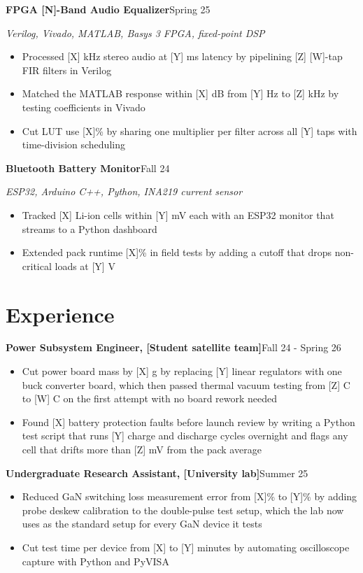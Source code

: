 \documentclass[letterpaper,11pt]{article}
\newlength{\itemgap}           %
\newcommand{\entry}[2]{\textbf{#1}\hfill #2\par}
\newcommand{\skillsused}[1]{\textit{#1}\par}
\begin{document}
\entry{FPGA [N]-Band Audio Equalizer}{Spring 25}
\skillsused{Verilog, Vivado, MATLAB, Basys 3 FPGA, fixed-point DSP}
\begin{itemize}
  \item Processed [X] kHz stereo audio at [Y] ms latency by pipelining [Z] [W]-tap FIR filters in Verilog
  \item Matched the MATLAB response within [X] dB from [Y] Hz to [Z] kHz by testing coefficients in Vivado
  \item Cut LUT use [X]\% by sharing one multiplier per filter across all [Y] taps with time-division scheduling
\end{itemize}
\vspace{\itemgap}

\entry{Bluetooth Battery Monitor}{Fall 24}
\skillsused{ESP32, Arduino C++, Python, INA219 current sensor}
\begin{itemize}
  \item Tracked [X] Li-ion cells within [Y] mV each with an ESP32 monitor that streams to a Python dashboard
  \item Extended pack runtime [X]\% in field tests by adding a cutoff that drops non-critical loads at [Y] V
\end{itemize}

\section{Experience}

\entry{Power Subsystem Engineer, {[}Student satellite team{]}}{Fall 24 - Spring 26}
\begin{itemize}
  \item Cut power board mass by [X] g by replacing [Y] linear regulators with one buck converter board, which then passed thermal vacuum testing from [Z] \textdegree{}C to [W] \textdegree{}C on the first attempt with no board rework needed
  \item Found [X] battery protection faults before launch review by writing a Python test script that runs [Y] charge and discharge cycles overnight and flags any cell that drifts more than [Z] mV from the pack average
\end{itemize}
\vspace{\itemgap}

\entry{Undergraduate Research Assistant, {[}University lab{]}}{Summer 25}
\begin{itemize}
  \item Reduced GaN switching loss measurement error from [X]\% to [Y]\% by adding probe deskew calibration to the double-pulse test setup, which the lab now uses as the standard setup for every GaN device it tests
  \item Cut test time per device from [X] to [Y] minutes by automating oscilloscope capture with Python and PyVISA
\end{itemize}
\end{document}
